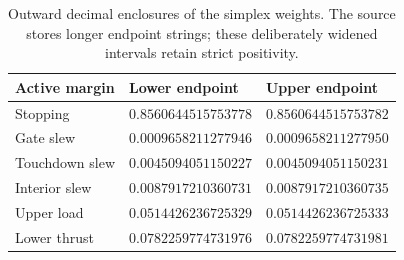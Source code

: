 \begin{table}[htbp]\centering\caption{Outward decimal enclosures of the simplex weights. The source stores longer endpoint strings; these deliberately widened intervals retain strict positivity.}\label{tab:weights}
\begin{tabular}{lll}\toprule
Active margin & Lower endpoint & Upper endpoint\\\midrule
Stopping & $0.8560644515753778$ & $0.8560644515753782$\\
Gate slew & $0.0009658211277946$ & $0.0009658211277950$\\
Touchdown slew & $0.0045094051150227$ & $0.0045094051150231$\\
Interior slew & $0.0087917210360731$ & $0.0087917210360735$\\
Upper load & $0.0514426236725329$ & $0.0514426236725333$\\
Lower thrust & $0.0782259774731976$ & $0.0782259774731981$\\\bottomrule
\end{tabular}\end{table}

